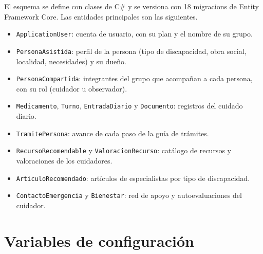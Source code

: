 El esquema se define con clases de C\# y se versiona con 18
\glspl{migracion} de Entity Framework Core. Las entidades principales son
las siguientes.

\begin{itemize}
    \item \texttt{ApplicationUser}: cuenta de usuario, con su plan y el nombre de su grupo.
    \item \texttt{PersonaAsistida}: perfil de la persona (tipo de discapacidad, obra social, localidad, necesidades) y su dueño.
    \item \texttt{PersonaCompartida}: integrantes del grupo que acompañan a cada persona, con su rol (cuidador u observador).
    \item \texttt{Medicamento}, \texttt{Turno}, \texttt{EntradaDiario} y \texttt{Documento}: registros del cuidado diario.
    \item \texttt{TramitePersona}: avance de cada paso de la guía de trámites.
    \item \texttt{RecursoRecomendable} y \texttt{ValoracionRecurso}: catálogo de recursos y valoraciones de los cuidadores.
    \item \texttt{ArticuloRecomendado}: artículos de especialistas por tipo de discapacidad.
    \item \texttt{ContactoEmergencia} y \texttt{Bienestar}: red de apoyo y autoevaluaciones del cuidador.
\end{itemize}

\section{Variables de configuración}

